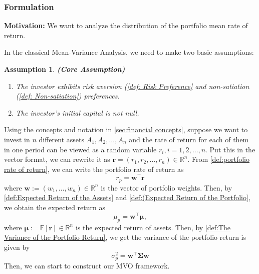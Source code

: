 \documentclass[13pt]{article}
\newtheorem{assumption}[theorem]{Assumption}
\theoremstyle{definition}
\theoremstyle{remark}
\begin{document}
\subsubsection{Formulation}
{\color{C6}\textbf{Motivation:} We want to analyze the distribution of the portfolio mean rate of return.}

In the classical Mean-Variance Analysis, we need to make two basic assumptions:
\begin{assumption}\textbf{(Core Assumption)}
\begin{enumerate}
    \item The investor exhibits risk aversion  (\cref{def: Risk Preference} and non-satiation (\cref{def: Non-satiation}) preferences.
    \item The investor's initial capital is not null.
\end{enumerate}
\end{assumption}

Using the concepts and notation in \cref{sec:financial concepts}, suppose we want to invest in $n$ different assets $A_1, A_2,\ldots, A_n$ and the rate of return for each of them in one period can be viewed as a random variable $r_i, i=1,2,\ldots, n$. Put this in the vector format, we can rewrite it as $\bm{r}=(r_1, r_2, \ldots, r_n)\in \mathbb{R}^n$. From \cref{def:portfolio rate of return}, we can write the portfolio rate of return as 
\[
r_p=\bm{w}^{\top} \bm{r}
\]
where $\bm{w}:=\left(w_{1}, \ldots, w_{n}\right)\in\mathbb{R}^n$ is the vector of portfolio weights. Then, by \cref{def:Expected Return of the Assets} and \cref{def:(Expected Return of the Portfolio}, we obtain the expected return as
$$
\mu_p =\bm{w}^{\top} \bm{\mu},
$$
where $\bm{\mu}:=\mathbb{E}[\bm{r}]\in\mathbb{R}^n$ is the expected return of assets. Then, by \cref{def:The Variance of the Portfolio Return}, we get the variance of the portfolio return is given by 
\[
\sigma_p^2 =\bm{w}^{\top} \mathbf{\Sigma} \bm{w}
\]
Then, we can start to construct our MVO framework.
\end{document}
